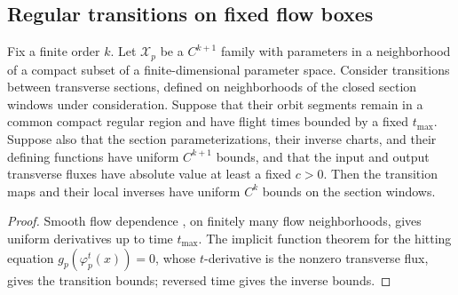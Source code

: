 \subsection{Regular transitions on fixed flow boxes}

\begin{lemma}
\label{lem:regular-transitions}
Fix a finite order \(k\). Let \(\mathcal X_p\) be a \(C^{k+1}\) family
with parameters in a neighborhood of a compact subset of a
finite-dimensional parameter space. Consider transitions between
transverse sections, defined on neighborhoods of the closed section
windows under consideration. Suppose that their orbit segments remain
in a common compact regular region and have flight times bounded by
a fixed \(t_{\max}\). Suppose also that the section parameterizations,
their inverse charts, and their defining functions have uniform
\(C^{k+1}\) bounds, and that the input and output transverse fluxes
have absolute value at least a fixed \(c>0\).
Then the transition maps and their local inverses have uniform \(C^k\)
bounds on the section windows.
\end{lemma}

\begin{proof}
Smooth flow dependence \cite[Theorem~2.11]{Teschl2012}, on finitely
many flow neighborhoods, gives uniform derivatives up to time \(t_{\max}\).
The implicit function theorem for the hitting equation
\(g_p(\varphi_p^t(x))=0\), whose \(t\)-derivative is the nonzero
transverse flux, gives the transition bounds; reversed time gives
the inverse bounds.
\end{proof}
